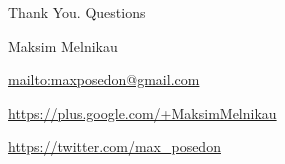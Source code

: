 \documentclass[aspectratio=169]{beamer}
\begin{document}
{

\begin{frame}{Thank You. Questions}
    \begin{block}{Maksim Melnikau}
    \par \url{mailto:maxposedon@gmail.com}
    \par \url{https://plus.google.com/+MaksimMelnikau}
    \par \url{https://twitter.com/max\_posedon}
    \end{block}
\end{frame}
}
\end{document}
